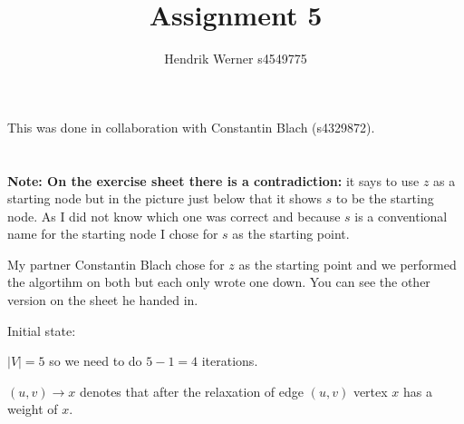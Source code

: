\documentclass[12pt]{article}
\title {Assignment 5}
\author {Hendrik Werner s4549775}
\begin{document}
\maketitle

This was done in collaboration with Constantin Blach (s4329872).

\section{} %
\section{} %
\section{} %
\textbf{Note: On the exercise sheet there is a contradiction:} it says to use $z$ as a starting node but in the picture just below that it shows $s$ to be the starting node. As I did not know which one was correct and because $s$ is a conventional name for the starting node I chose for $s$ as the starting point.

My partner Constantin Blach chose for $z$ as the starting point and we performed the algortihm on both but each only wrote one down. You can see the other version on the sheet he handed in.

Initial state:


$|V| = 5$ so we need to do $5 - 1 = 4$ iterations.

$(u, v) \rightarrow x$ denotes that after the relaxation of edge $(u, v)$ vertex $x$ has a weight of $x$.
\end{document}
